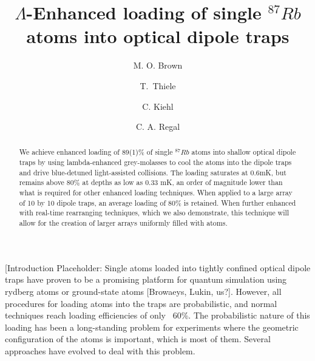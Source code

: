 \documentclass[aps,prl,amsmath,amssymb,groupedaddress,10pt,superscriptaddress,floatfix,twocolumn,showkeys,longbibliography]{revtex4-1} %
\begin{document}
\title{$\Lambda$-Enhanced loading of single $^{87} Rb$ atoms into optical dipole traps }

\author{M. O. Brown}  
\author{T.~Thiele}
\author{C. Kiehl}
\author{C. A. Regal} 

\pacs{}

\renewcommand{\i}{{\mathrm i}} \def\1{\mathchoice{\rm 1\mskip-4.2mu l}{\rm 1\mskip-4.2mu l}{\rm
1\mskip-4.6mu l}{\rm 1\mskip-5.2mu l}} \newcommand{\ket}[1]{|#1\rangle} \newcommand{\tybra}[1]{\langle
#1|} \newcommand{\braket}[2]{\langle #1|#2\rangle} \newcommand{\kebtra}[2]{|#1\rangle\langle#2|}
\newcommand{\opelem}[3]{\langle #1|#2|#3\rangle} \newcommand{\projection}[1]{|#1\rangle\langle#1|}
\newcommand{\scalar}[1]{\langle #1|#1\rangle} \newcommand{\op}[1]{\hat{#1}}
\newcommand{\vect}[1]{\boldsymbol{#1}} \newcommand{\id}{\text{id}}

\begin{abstract}
We achieve enhanced loading of 89(1)\% of single $^{87} Rb$ atoms into shallow optical dipole traps by using lambda-enhanced grey-molasses to cool the atoms into the dipole traps and drive blue-detuned light-assisted collisions. The loading saturates at 0.6mK, but remains above 80\% at depths as low as 0.33 mK, an order of magnitude lower than what is required for other enhanced loading techniques. When applied to a large array of 10 by 10 dipole traps, an average loading of 80\% is retained. When further enhanced with real-time rearranging techniques, which we also demonstrate, this technique will allow for the creation of larger arrays uniformly filled with atoms.
\end{abstract}
\maketitle

[Introduction Placeholder: Single atoms loaded into tightly confined optical dipole traps have proven to be a promising platform for quantum simulation using rydberg atoms or ground-state atoms [Browaeys, Lukin, us?].  However, all procedures for loading atoms into the traps are probabilistic, and normal techniques reach loading efficiencies of only ~60\%. The probabilistic nature of this loading has been a long-standing problem for experiments where the geometric configuration of the atoms is important, which is most of them. Several approaches have evolved to deal with this problem.
\end{document}
